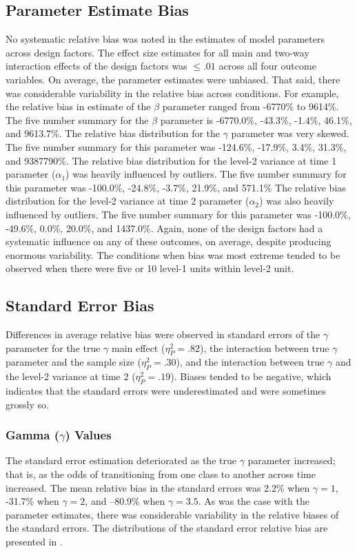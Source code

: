 \documentclass[man, noextraspace, floatsintext, 12pt]{apa7}
\begin{document}
\subsection*{Parameter Estimate Bias}
No systematic relative bias was noted in the estimates of model parameters across design factors. The effect size estimates for all main and two-way interaction effects of the design factors was $\leq .01$ across all four outcome variables. On average, the parameter estimates were unbiased. That said, there was considerable variability in the relative bias across conditions. For example, the relative bias in estimate of the $\beta$ parameter ranged from -6770\% to 9614\%. The five number summary for the $\beta$ parameter is -6770.0\%, -43.3\%, -1.4\%, 46.1\%, and 9613.7\%. The relative bias distribution for the $\gamma$ parameter was very skewed. The five number summary for this parameter was -124.6\%, -17.9\%, 3.4\%, 31.3\%, and 9387790\%. The relative bias distribution for the level-2 variance at time 1 parameter ($\alpha_1$) was heavily influenced by outliers. The five number summary for this parameter was -100.0\%, -24.8\%, -3.7\%, 21.9\%, and 571.1\% The relative bias distribution for the level-2 variance at time 2 parameter ($\alpha_2$) was also heavily influenced by outliers. The five number summary for this parameter was -100.0\%, -49.6\%, 0.0\%, 20.0\%, and 1437.0\%. Again, none of the design factors had a systematic influence on any of these outcomes, on average, despite producing enormous variability. The conditions when bias was most extreme tended to be observed when there were five or 10 level-1 units within level-2 unit. 

\subsection*{Standard Error Bias}
Differences in average relative bias were observed in standard errors of the $\gamma$ parameter for the true $\gamma$ main effect ($\eta_P^2 = .82$), the interaction between true $\gamma$ parameter and the sample size ($\eta_P^2 = .30$), and the interaction between true $\gamma$ and the level-2 variance at time 2 ($\eta_P^2 = .19$). Biases tended to be negative, which indicates that the standard errors were underestimated and were sometimes grossly so. 

\subsubsection*{Gamma ($\gamma$) Values}
The standard error estimation deteriorated as the true $\gamma$ parameter increased; that is, as the odds of transitioning from one class to another across time increased. The mean relative bias in the standard errors was 2.2\% when $\gamma=1$, -31.7\% when $\gamma=2$, and --80.9\% when $\gamma=3.5$. As was the case with the parameter estimates, there was considerable variability in the relative biases of the standard errors. The distributions of the standard error relative bias are presented in .
\end{document}
